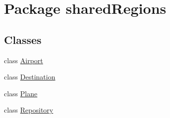 \hypertarget{namespaceshared_regions}{}\section{Package shared\+Regions}
\label{namespaceshared_regions}
\subsection*{Classes}
\begin{DoxyCompactItemize}
\item 
class \hyperlink{classshared_regions_1_1_airport}{Airport}
\item 
class \hyperlink{classshared_regions_1_1_destination}{Destination}
\item 
class \hyperlink{classshared_regions_1_1_plane}{Plane}
\item 
class \hyperlink{classshared_regions_1_1_repository}{Repository}
\end{DoxyCompactItemize}
